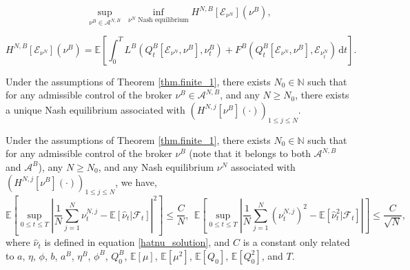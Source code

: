 \documentclass[10pt,a4paper]{amsart}
\begin{document}
\begin{equation}\label{lem.finite_problem_for_broker}
    \underset{\nu^B \in \mathcal{A}^{N,B}}{\sup} ~\underset{\nu^N \text{~Nash equilibrium}}{\inf} H^{N,B}\left[\mathcal{E}_{\nu^N}\right] \left(\nu^B\right),
\end{equation}

\begin{equation}\label{broker_obj_finite}
    H^{N,B}\left[\mathcal{E}_{\nu^N}\right]\left(\nu^B\right) = \mathbb{E} \left[ \int_0^T L^B(Q^B_t[\mathcal{E}_{\nu^N}, \nu^B], \nu^B_t) + F^B(Q^B_t[\mathcal{E}_{\nu^N}, \nu^B], \mathcal{E}_{\nu_t^N}) \, \mathrm{d}t \right].
\end{equation}

\begin{lemma}\label{lem.finite_2}
Under the assumptions of Theorem \ref{thm.finite_1}, there exists $N_0 \in \mathbb{N}$ such that for any admissible control of the broker $\nu^B \in \mathcal{A}^{N,B}$, and any $N \geq N_0$, there exists a unique Nash equilibrium associated with $(H^{N,j}[\nu^B](\cdot))_{1 \leq j \leq N}$.
\end{lemma}

\begin{lemma}\label{lem.finite_3}
Under the assumptions of Theorem \ref{thm.finite_1}, there exists $N_0 \in \mathbb{N}$ such that for any admissible control of the broker $\nu^B$ 
(note that it belongs to both $\mathcal{A}^{N,B}$ and $\mathcal{A}^B$), any $N \geq N_0$, and any Nash equilibrium $\nu^N$ associated with $(H^{N,j}[\nu^B](\cdot))_{1 \leq j \leq N}$, we have,
\begin{equation}\label{difference_between_hatnu_and_empirical_nu}
    \mathbb{E} \left[ \underset{0 \leq t \leq T}{\sup} \left| \frac{1}{N} \sum_{j=1}^{N} \nu_t^{N,j} - \mathbb{E}[\hat{\nu}_t | \mathcal{F}_t] \right|^2 \right] \leq \frac{C}{N},~~
    \mathbb{E} \left[ \underset{0 \leq t \leq T}{\sup} \left| \frac{1}{N} \sum_{j=1}^{N} \left(\nu_t^{N,j}\right)^2 - \mathbb{E}[\hat{\nu}_t^2 | \mathcal{F}_t] \right| \right] \leq \frac{C}{\sqrt{N}},
\end{equation}
where $\hat{\nu}_t$ is defined in equation \eqref{hatnu_solution}, and $C$ is a constant only related to $a$, $\eta$, $\phi$, $b$, $a^B$, $\eta^B$, $\phi^B$, $Q_0^B$, $\mathbb{E}[\mu]$, $\mathbb{E}[\mu^2]$, $\mathbb{E}[Q_0]$, $\mathbb{E}[Q_0^2]$, and $T$.
\end{lemma}
\end{document}
